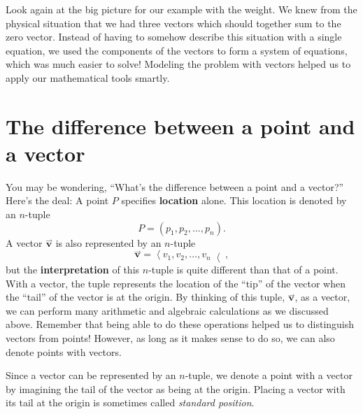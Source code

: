 \documentclass{ximera}
\begin{document}
Look again at the big picture for our example with the weight. 
We knew from the physical situation that we had three vectors which 
should together sum to the zero vector.  Instead of having to somehow 
describe this situation with a single equation, we used the components 
of the vectors to form a system of equations, which was much easier 
to solve! Modeling the problem with vectors helped us to apply our 
mathematical tools smartly.




\section{The difference between a point and a vector}

You may be wondering, ``What's the difference between a point and a
vector?'' Here's the deal: A point $P$ specifies \textbf{location}
alone. This location is denoted by an $n$-tuple
\[
P=(p_1,p_2,\dots,p_n).
\]
A vector $\overset{\rightharpoonup}{\mathbf{v}}$ is also represented by an $n$-tuple
\[
\overset{\rightharpoonup}{\mathbf{v}} = \left\langle v_1,v_2,\dots,v_n \right\langle,
\]
but the \textbf{interpretation} of this $n$-tuple is quite different
than that of a point. With a vector, the tuple represents the location of the
``tip'' of the vector when the ``tail'' of the vector is at the
origin. By thinking of this tuple, $\overset{\rightharpoonup}{\mathbf{v}}$, as a vector, we can
perform many arithmetic and algebraic calculations as we discussed
above.  Remember that being able to do these operations helped us to 
distinguish vectors from points! However, as long as it makes sense to do so, we can also 
denote points with vectors.
\begin{image}
\end{image}
Since a vector can be represented by an $n$-tuple, we denote a point
with a vector by imagining the tail of the vector as being at the
origin. Placing a vector with its tail at the origin is sometimes
called \textit{standard position}.
\end{document}
